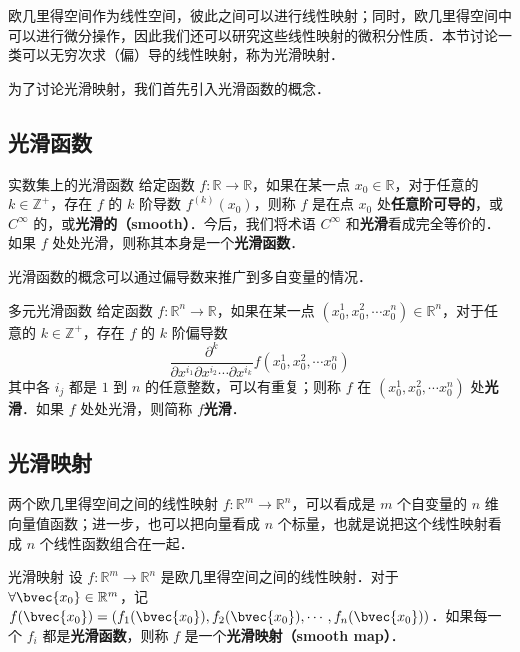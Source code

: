 

欧几里得空间作为线性空间，彼此之间可以进行线性映射；同时，欧几里得空间中可以进行微分操作，因此我们还可以研究这些线性映射的微积分性质．本节讨论一类可以无穷次求（偏）导的线性映射，称为光滑映射．

为了讨论光滑映射，我们首先引入光滑函数的概念．

\subsection{光滑函数}

\begin{definition}{实数集上的光滑函数}
给定函数 $f:\mathbb{R}\rightarrow\mathbb{R}$，如果在某一点 $x_0\in\mathbb{R}$，对于任意的 $k\in\mathbb{Z}^+$，存在 $f$ 的 $k$ 阶导数 $f^{(k)}(x_0)$，则称 $f$ 是在点 $x_0$ 处\textbf{任意阶可导的}，或 $C^\infty$ 的，或\textbf{光滑的（smooth）}．今后，我们将术语 $C^{\infty}$ 和\textbf{光滑}看成完全等价的．如果 $f$ 处处光滑，则称其本身是一个\textbf{光滑函数}．
\end{definition}

光滑函数的概念可以通过偏导数来推广到多自变量的情况．

\begin{definition}{多元光滑函数}
给定函数 $f:\mathbb{R}^n\rightarrow\mathbb{R}$，如果在某一点 $(x_0^1, x_0^2, \cdots x_0^n) \in\mathbb{R}^n$，对于任意的 $k\in\mathbb{Z}^+$，存在 $f$ 的 $k$ 阶偏导数$$\frac{\partial^k}{\partial x^{i_1}\partial x^{i_2}\cdots\partial x^{i_k}}f(x_0^1, x_0^2, \cdots x_0^n)$$其中各 $i_j$ 都是 $1$ 到 $n$ 的任意整数，可以有重复；则称 $f$ 在 $(x_0^1, x_0^2, \cdots x_0^n)$ 处\textbf{光滑}．如果 $f$ 处处光滑，则简称 $f$\textbf{光滑}．
\end{definition}

\subsection{光滑映射}

两个欧几里得空间之间的线性映射 $f:\mathbb{R}^m\rightarrow \mathbb{R}^n$，可以看成是 $m$ 个自变量的 $n$ 维向量值函数；进一步，也可以把向量看成 $n$ 个标量，也就是说把这个线性映射看成 $n$ 个线性函数组合在一起．

\begin{definition}{光滑映射}
设 $f:\mathbb{R}^m\rightarrow \mathbb{R}^n$ 是欧几里得空间之间的线性映射．对于 $\forall \bvec{x_0} \in \mathbb{R}^m$，记 $f(\bvec{x_0})=(f_1(\bvec{x_0}), f_2(\bvec{x_0}),\cdots, f_n(\bvec{x_0}))$．如果每一个 $f_i$ 都是\textbf{光滑函数}，则称 $f$ 是一个\textbf{光滑映射（smooth map）}．
\end{definition}


